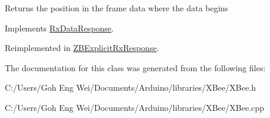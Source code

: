 Returns the position in the frame data where the data begins 

Implements \hyperlink{class_rx_data_response_a9e4b6bf4f1bfd9ccec45d190a204f61a}{Rx\+Data\+Response}.



Reimplemented in \hyperlink{class_z_b_explicit_rx_response_aac859574ace86ba08f6abb9d865fec17}{Z\+B\+Explicit\+Rx\+Response}.



The documentation for this class was generated from the following files\+:\begin{DoxyCompactItemize}
\item 
C\+:/\+Users/\+Goh Eng Wei/\+Documents/\+Arduino/libraries/\+X\+Bee/X\+Bee.\+h\item 
C\+:/\+Users/\+Goh Eng Wei/\+Documents/\+Arduino/libraries/\+X\+Bee/X\+Bee.\+cpp\end{DoxyCompactItemize}
